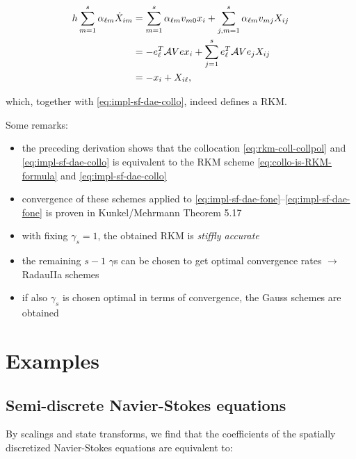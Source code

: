 \documentclass[]{book}
\providecommand{\tightlist}{%
  \setlength{\itemsep}{0pt}\setlength{\parskip}{0pt}}
\theoremstyle{definition}
\theoremstyle{definition}
\theoremstyle{definition}
\theoremstyle{remark}
\begin{document}
\begin{align}
  h\sum_{m=1}^s \alpha_{\ell m}\dot X_{im} &= \sum_{m=1}^s \alpha_{\ell m}v_{m0}x_i + \sum_{j,m=1}^s \alpha_{\ell m}v_{mj}X_{ij} \notag \\
  &= -e_\ell^T \mathcal AV e x_i + \sum_{j=1}^se_\ell^T \mathcal AVe_jX_{ij} \label{eq:collo-is-RKM-formula}\\
  &= -x_i + X_{i\ell}, \notag
\end{align}

which, together with \eqref{eq:impl-sf-dae-collo}, indeed defines a RKM.

Some remarks:

\begin{itemize}
\tightlist
\item
  the preceding derivation shows that the collocation
  \eqref{eq:rkm-coll-collpol} and \eqref{eq:impl-sf-dae-collo} is equivalent
  to the RKM scheme \eqref{eq:collo-is-RKM-formula} and
  \eqref{eq:impl-sf-dae-collo}
\item
  convergence of these schemes applied to
  \eqref{eq:impl-sf-dae-fone}--\eqref{eq:impl-sf-dae-fone} is proven in
  Kunkel/Mehrmann Theorem 5.17
\item
  with fixing \(\gamma_s=1\), the obtained RKM is \emph{stiffly
  accurate}
\item
  the remaining \(s-1\) \(\gamma\)s can be chosen to get optimal
  convergence rates \(\rightarrow\) RadauIIa schemes
\item
  if also \(\gamma_s\) is chosen optimal in terms of convergence, the
  Gauss schemes are obtained
\end{itemize}

\chapter{Examples}\label{examples-1}

\section{Semi-discrete Navier-Stokes
equations}\label{semi-discrete-navier-stokes-equations}

By scalings and state transforms, we find that the coefficients of the
spatially discretized Navier-Stokes equations are equivalent to:
\end{document}
